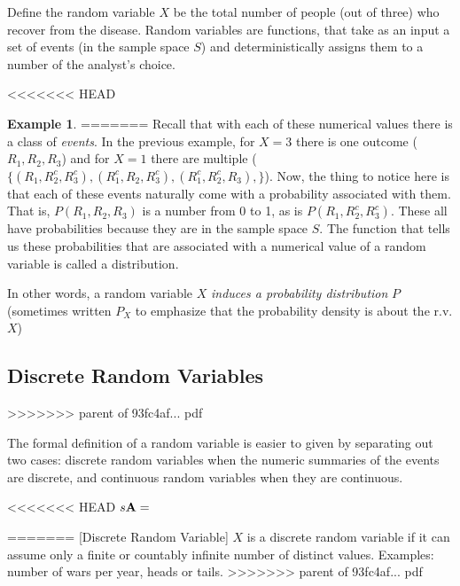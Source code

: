 \documentclass[]{book}
\theoremstyle{definition}
\theoremstyle{definition}
\newtheorem{example}{Example}[chapter]
\theoremstyle{definition}
\theoremstyle{remark}
\begin{document}
{}Define the random variable \(X\) be the total number of people (out of three) who recover from the disease. Random variables are functions, that take as an input a set of events (in the sample space \(S\)) and deterministically assigns them to a number of the analyst's choice.

<<<<<<< HEAD
\begin{example}
\protect\hypertarget{exm:scalarmulti}{}{\label{exm:scalarmulti} }
=======
Recall that with each of these numerical values there is a class of \emph{events}. In the previous example, for \(X = 3\) there is one outcome (\(R_1, R_2, R_3\)) and for \(X = 1\) there are multiple (\(\{(R_1, R_2^c, R_3^c), (R_1^c, R_2, R_3^c), (R_1^c, R_2^c, R_3), \}\)). Now, the thing to notice here is that each of these events naturally come with a probability associated with them. That is, \(P(R_1, R_2, R_3)\) is a number from 0 to 1, as is \(P(R_1, R_2^c, R_3^c)\). These all have probabilities because they are in the sample space \(S\). The function that tells us these probabilities that are associated with a numerical value of a random variable is called a distribution.

In other words, a random variable \(X\) \emph{induces a probability distribution} \(P\) (sometimes written \(P_X\) to emphasize that the probability density is about the r.v. \(X\))

\hypertarget{discrete-random-variables}{%
\subsection*{Discrete Random Variables}\label{discrete-random-variables}}
>>>>>>> parent of 93fc4af... pdf

The formal definition of a random variable is easier to given by separating out two cases: discrete random variables when the numeric summaries of the events are discrete, and continuous random variables when they are continuous.

<<<<<<< HEAD
\(s {\bf A} =\)
\end{example}
=======
[Discrete Random Variable]
\protect\hypertarget{def:unnamed-chunk-75}{}{\label{def:unnamed-chunk-75} {} }\(X\) is a discrete random variable if it can assume only a finite or countably infinite number of distinct values. Examples: number of wars per year, heads or tails.
>>>>>>> parent of 93fc4af... pdf
\end{document}
